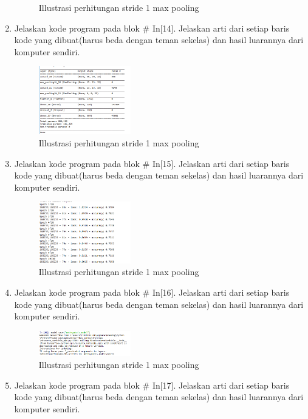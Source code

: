 \begin{enumerate}
\begin{figure}[H]
    \caption{Illustrasi perhitungan stride 1 max pooling}
\end{figure}
\item Jelaskan kode program pada blok \# In[14]. Jelaskan arti dari setiap baris kode yang dibuat(harus beda dengan teman sekelas) dan hasil luarannya dari komputer sendiri.

\begin{figure}[H]
    \includegraphics[width=4cm]{figures/1174035/chapter7/praktek_14.png}
    \centering
    \caption{Illustrasi perhitungan stride 1 max pooling}
\end{figure}
\item Jelaskan kode program pada blok \# In[15]. Jelaskan arti dari setiap baris kode yang dibuat(harus beda dengan teman sekelas) dan hasil luarannya dari komputer sendiri.

\begin{figure}[H]
    \includegraphics[width=4cm]{figures/1174035/chapter7/praktek_15.png}
    \centering
    \caption{Illustrasi perhitungan stride 1 max pooling}
\end{figure}
\item Jelaskan kode program pada blok \# In[16]. Jelaskan arti dari setiap baris kode yang dibuat(harus beda dengan teman sekelas) dan hasil luarannya dari komputer sendiri.

\begin{figure}[H]
    \includegraphics[width=4cm]{figures/1174035/chapter7/praktek_16.png}
    \centering
    \caption{Illustrasi perhitungan stride 1 max pooling}
\end{figure}
\item Jelaskan kode program pada blok \# In[17]. Jelaskan arti dari setiap baris kode yang dibuat(harus beda dengan teman sekelas) dan hasil luarannya dari komputer sendiri.

\end{enumerate}
